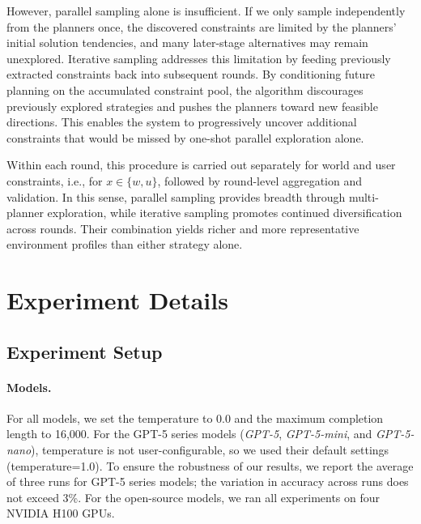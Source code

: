 \documentclass{llmxive}
\begin{document}
However, parallel sampling alone is insufficient. 
If we only sample independently from the planners once, the discovered constraints are limited by the planners' initial solution tendencies, and many later-stage alternatives may remain unexplored. 
Iterative sampling addresses this limitation by feeding previously extracted constraints back into subsequent rounds. 
By conditioning future planning on the accumulated constraint pool, the algorithm discourages previously explored strategies and pushes the planners toward new feasible directions. 
This enables the system to progressively uncover additional constraints that would be missed by one-shot parallel exploration alone.

Within each round, this procedure is carried out separately for world and user constraints, i.e., for $x\in\{w,u\}$, followed by round-level aggregation and validation. 
In this sense, parallel sampling provides breadth through multi-planner exploration, while iterative sampling promotes continued diversification across rounds. 
Their combination yields richer and more representative environment profiles than either strategy alone.











\section{Experiment Details}
\label{app:exp-details}

\subsection{Experiment Setup}
\label{app:model-setup}

\paragraph{Models.}
For all models, we set the temperature to 0.0 and the maximum completion length to 16{,}000. 
For the GPT-5 series models (\textit{GPT-5}, \textit{GPT-5-mini}, and \textit{GPT-5-nano}), temperature is not user-configurable, so we used their default settings (temperature=1.0). 
To ensure the robustness of our results, we report the average of three runs for GPT-5 series models; the variation in accuracy across runs does not exceed 3\%.
For the open-source models, we ran all experiments on four NVIDIA H100 GPUs.
\end{document}
